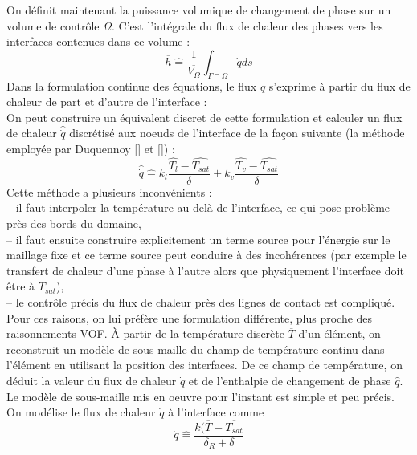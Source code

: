 On d\'efinit maintenant la puissance volumique de changement de phase sur un volume de contr\^ole $\Omega$. C’est l’int\'egrale du flux de chaleur des phases vers les interfaces contenues dans ce volume :
\begin{equation}
\overline{h} \hat{=} \dfrac{1}{\overline{V_{\Omega}}} \int_{\Gamma\cap\Omega} \dot{q} ds
\end{equation}
Dans la formulation continue des \'equations, le flux $\dot{q}$ s’exprime \`a partir du flux de chaleur de part et d’autre de l’interface :
\begin{equation}
\end{equation}
On peut construire un \'equivalent discret de cette formulation et calculer un flux de chaleur $\hat{\dot{q}}$ discr\'etis\'e aux noeuds de l’interface de la façon suivante (la m\'ethode employ\'ee par Duquennoy [\cite{Duquennoy2000}] et [\cite{Shin2002}]) :
\begin{equation}
\hat{\dot{q}} \hat{=} k_{l} \dfrac{\hat{T_{l}} - \hat{T_{sat}}}{\delta} + k_{v} \dfrac{\hat{T_{v}} - \hat{T_{sat}}}{\delta}
\end{equation}
Cette m\'ethode a plusieurs inconv\'enients :\\
– il faut interpoler la temp\'erature au-delà de l’interface, ce qui pose probl\`eme\\
près des bords du domaine,\\
– il faut ensuite construire explicitement un terme source pour l’\'energie sur
le maillage fixe et ce terme source peut conduire \`a des incoh\'erences (par
exemple le transfert de chaleur d’une phase \`a l’autre alors que physiquement
l’interface doit \^etre \`a $T_{sat}$),\\
– le contr\^ole pr\'ecis du flux de chaleur pr\`es des lignes de contact est compliqu\'e.\\
Pour ces raisons, on lui pr\'efère une formulation diff\'erente, plus proche des raisonnements VOF. À partir de la temp\'erature discrète $\overline{T}$ d’un \'el\'ement, on reconstruit un mod\`ele de sous-maille du champ de temp\'erature continu dans l’\'el\'ement en utilisant la position des interfaces. De ce champ de temp\'erature, on d\'eduit la valeur du flux de chaleur $\dot{q}$ et de l’enthalpie de changement de phase $\hat{q}$.\\
Le mod\`ele de sous-maille mis en oeuvre pour l’instant est simple et peu pr\'ecis.
On mod\'elise le flux de chaleur $\dot{q}$ à l’interface comme
\begin{equation}
\dot{q} \hat{=} \dfrac{k(\overline{T}-\overline{T_{sat}}}{\delta_{R}+\delta}
\end{equation}

